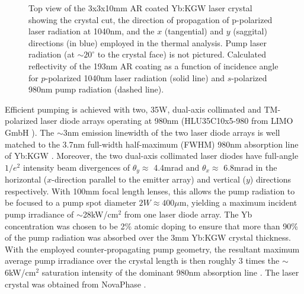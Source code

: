 \begin{figure}
  \subfloat[][]{
    \label{fig:crystal_geo}
    
  }
  \caption[Laser crystal and anti-reflection coating]{
    \protect{} Top view of the 3x3x10mm AR coated Yb:KGW laser crystal showing the crystal cut, the direction of propagation of p-polarized laser radiation at 1040nm, and the $x$ (tangential) and $y$ (saggital) directions (in blue) employed in the thermal analysis.
    Pump laser radiation (at $\sim 20^{\circ}$ to the crystal face) is not pictured.
    \protect{} Calculated reflectivity of the 193nm  AR coating as a function of incidence angle for $p$-polarized 1040nm laser radiation (solid line) and $s$-polarized 980nm pump radiation (dashed line).
  }
  \label{fig:crystal}
\end{figure}

Efficient pumping is achieved with two, 35W, dual-axis collimated and TM-polarized laser diode arrays operating at 980nm (HLU35C10x5-980 from LIMO GmbH \cite{website_limo}).
The $\sim$3nm emission linewidth of the two laser diode arrays is well matched to the 3.7nm full-width half-maximum (FWHM) 980nm absorption line of Yb:KGW \cite{Paunescu_diode_2004,Biswal_thermo_optical_05,website_EKSPLA}.
Moreover, the two dual-axis collimated laser diodes have full-angle $1/e^2$ intensity beam divergences of $\theta_y \approx$ 4.4mrad and $\theta_x \approx$ 6.8mrad in the horizontal ($x$-direction parallel to the emitter array) and vertical ($y$) directions respectively. 
With 100mm focal length lenses, this allows the pump radiation to be focused to a pump spot diameter $2W \approx 400\mu$m, yielding a maximum incident pump irradiance of $\sim$28kW/cm$^2$ from one laser diode array.
The Yb concentration was chosen to be 2\% atomic doping to ensure that more than 90\% of the pump radiation was absorbed over the 3mm Yb:KGW crystal thickness.
With the employed counter-propagating pump geometry, the resultant maximum average pump irradiance over the crystal length is then roughly 3 times the $\sim$6kW/cm$^2$ saturation intensity of the dominant 980nm absorption line \cite{Brunner_powerful_2004}.
The laser crystal was obtained from NovaPhase \cite{website_nova}.

